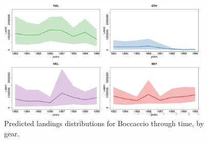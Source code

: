 \documentclass[12pt]{article}
\begin{document}
%
\begin{figure}[h!]
	\centering
        \includegraphics[width=0.9\textwidth]{./gearDists.png}
	\caption{Predicted landings distributions for Boccaccio through time, by gear.}
\end{figure}

%
\clearpage

%
%
\end{document}
